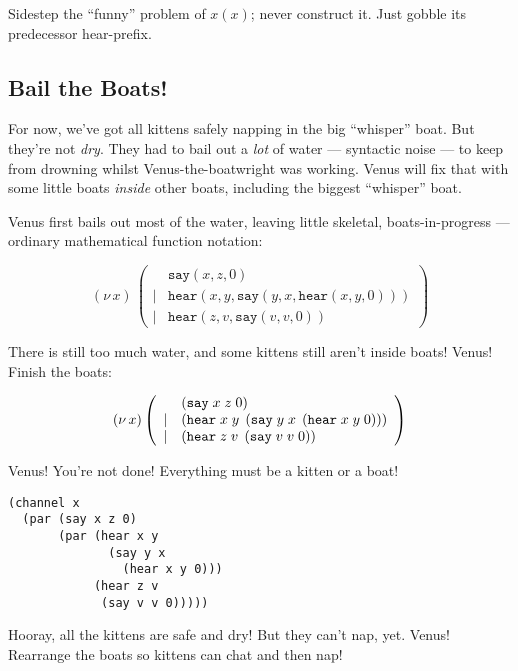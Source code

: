\documentclass[10pt,oneside,x11names]{article}
\newcommand\napping    [0]{0}
\newcommand\whispering [2]{(\nu\,#1)\,{#2}}
\theoremstyle{definition}
\theoremstyle{warning}
\newcommand\say [3]{\left(\texttt{say}\thickspace{}#1\thickspace{}#2\thickspace{}#3\right)}
\newcommand\hear[3]{\left(\texttt{hear}\thickspace{}#1\thickspace{}#2\thickspace{}#3\right)}
\newcommand\kitA{\say{x}{z}{\napping}}
\newcommand\kitB{\hear{x}{y}{\say{y}{x}{\hear{x}{y}{\napping}}}}
\newcommand\kitC{\hear{z}{v}{\say{v}{v}{\napping}}}
\begin{document}
Sidestep the ``funny'' problem of \(x(x)\); never construct it.
Just gobble its predecessor hear-prefix.

\subsection{Bail the Boats!}
\label{sec:org10d1993}

For now, we've got all kittens safely napping in the big
``whisper'' boat. But they're not \emph{dry}. They had to bail out a
\emph{lot} of water --- syntactic noise --- to keep from drowning
whilst Venus-the-boatwright was working. Venus will fix that
with some little boats \emph{inside} other boats, including the
biggest ``whisper'' boat.

Venus first bails out most of the water, leaving little skeletal,
boats-in-progress --- ordinary mathematical function notation:

\begin{equation}
\whispering{x}{\left(
\begin{array}{clll}
 {}     & \texttt{say} (x, z, \napping) \\
 \vert  & \texttt{hear}(x, y, \texttt{say}(y, x, \texttt{hear}(x, y, \napping))) \\
 \vert  & \texttt{hear}(z, v, \texttt{say}(v, v, \napping))
\end{array}\right)}
\end{equation}

There is still too much water, and some kittens
still aren't inside boats! Venus! Finish the boats:

\begin{equation}
\whispering{x}{\left(
\begin{array}{clll}
 {}     & \kitA \\
 \vert  & \kitB \\
 \vert  & \kitC \\
\end{array}\right)}
\end{equation}

Venus! You're not done! Everything must be a kitten or a boat!

\vskip 0.26cm
\begin{verbatim}
(channel x
  (par (say x z 0)
       (par (hear x y
              (say y x
                (hear x y 0)))
            (hear z v
             (say v v 0)))))
\end{verbatim}

Hooray, all the kittens are safe and dry! But they can't nap, yet.
Venus! Rearrange the boats so kittens can chat and then nap!
\end{document}
